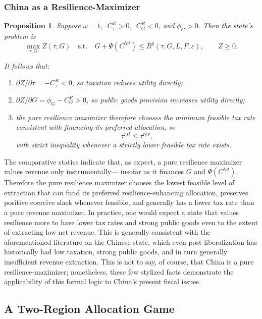 \documentclass[12pt]{article}
\newtheorem{proposition}{Proposition}
\begin{document}
\subsubsection{China as a Resilience-Maximizer}

\begin{proposition}\label{prop:pure_resilience}
Suppose $\omega=1$, $\;C^R_\tau>0$, $\;C^R_G<0$, and $\phi_G>0$. Then the state's problem is
\[
\max_{\tau,G} Z(\tau,G)
\quad \text{s.t.} \quad
G+\Psi(C^{tot}) \le R^g(\tau,G,L,F,\varepsilon), \qquad Z\ge 0.
\]

It follows that:
\begin{enumerate}
    \item $\partial Z/\partial \tau = -C^R_\tau <0$, so taxation reduces utility directly;
    
    \item $\partial Z/\partial G = \phi_G - C^R_G >0$, so public goods provision increases utility directly;
    
    \item the pure resilience maximizer therefore chooses the minimum feasible tax rate consistent with financing its preferred allocation, so
    \[
    \tau^{rsl} \le \tau^{rev},
    \]
    with strict inequality whenever a strictly lower feasible tax rate exists.
\end{enumerate}
\end{proposition}

The comparative statics indicate that, as expect, a pure resilience maximizer values revenue only instrumentally--- insofar as it finances $G$ and $\Psi(C^{tot})$. Therefore the pure resilience maximizer chooses the lowest feasible level of extraction that can fund its preferred resilience-enhancing allocation, preserves positive coercive slack whenever feasible, and generally has a lower tax rate than a pure revenue maximizer. In practice, one would expect a state that values resilience more to have lower tax rates and strong public goods even to the extent of extracting low net revenue. This is generally consistent with the aforementioned literature on the Chinese state, which even post-liberalization has historically had low taxation, strong public goods, and in turn generally insufficient revenue extraction. This is not to say, of course, that China is a pure resilience-maximizer; nonetheless, these few stylized facts demonstrate the applicability of this formal logic to China's present fiscal issues.

\subsection{A Two-Region Allocation Game}
\end{document}
